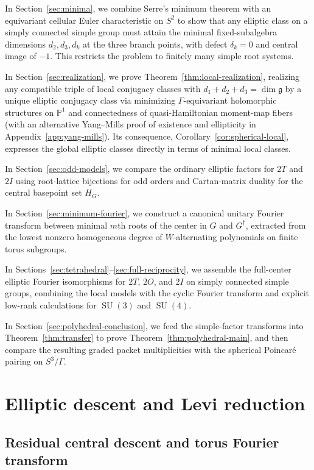 \documentclass[11pt,a4paper,reqno]{amsart}
\theoremstyle{plain}
\theoremstyle{definition}
\theoremstyle{remark}
\numberwithin{equation}{section}
\newcommand{\SU}{\operatorname{SU}}
\newcommand{\PP}{\mathbb P}
\newcommand{\fg}{\mathfrak g}
\begin{document}
In Section~\ref{sec:minima}, we combine Serre's minimum theorem with an equivariant cellular Euler characteristic on $S^2$ to show that any elliptic class on a simply connected simple group must attain the minimal fixed-subalgebra dimensions $d_2,d_3,d_k$ at the three branch points, with defect $\delta_k=0$ and central image of $-1$. This restricts the problem to finitely many simple root systems.

In Section~\ref{sec:realization}, we prove Theorem~\ref{thm:local-realization}, realizing any compatible triple of local conjugacy classes with $d_1+d_2+d_3=\dim\fg$ by a unique elliptic conjugacy class via minimizing $\Gamma$-equivariant holomorphic structures on $\PP^1$ and connectedness of quasi-Hamiltonian moment-map fibers (with an alternative Yang--Mills proof of existence and ellipticity in Appendix~\ref{app:yang-mills}). Its consequence, Corollary~\ref{cor:spherical-local}, expresses the global elliptic classes directly in terms of minimal local classes.

In Section~\ref{sec:odd-models}, we compare the ordinary elliptic factors for $2T$ and $2I$ using root-lattice bijections for odd orders and Cartan-matrix duality for the central basepoint set $H_G$.

In Section~\ref{sec:minimum-fourier}, we construct a canonical unitary Fourier transform between minimal $m$th roots of the center in $G$ and $G^\dagger$, extracted from the lowest nonzero homogeneous degree of $W$-alternating polynomials on finite torus subgroups.

In Sections~\ref{sec:tetrahedral}--\ref{sec:full-reciprocity}, we assemble the full-center elliptic Fourier isomorphisms for $2T$, $2O$, and $2I$ on simply connected simple groups, combining the local models with the cyclic Fourier transform and explicit low-rank calculations for $\SU(3)$ and $\SU(4)$.

In Section~\ref{sec:polyhedral-conclusion}, we feed the simple-factor transforms into Theorem~\ref{thm:transfer} to prove Theorem~\ref{thm:polyhedral-main}, and then compare the resulting graded packet multiplicities with the spherical Poincar\'e pairing on $S^3/\Gamma$.

\section{Elliptic descent and Levi reduction}\label{sec:central-descent}

\subsection{Residual central descent and torus Fourier transform}
\end{document}
